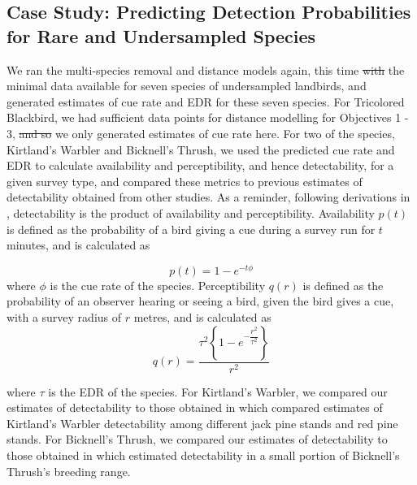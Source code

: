 \documentclass[12pt]{article}
\makeatletter
\providecommand{\DIFadd}[1]{{\protect\color{blue}\uwave{#1}}} %
\providecommand{\DIFdel}[1]{{\protect\color{red}\sout{#1}}} %
\providecommand{\DIFaddbegin}{} %
\providecommand{\DIFaddend}{} %
\providecommand{\DIFdelbegin}{} %
\providecommand{\DIFdelend}{} %
\newcommand{\DIFscaledelfig}{0.5}
\newlength{\DIFdelgraphicswidth} %
\newlength{\DIFdelgraphicsheight} %
\newcommand{\DIFaddincludegraphics}[2][]{{\color{blue}\fbox{\DIFOincludegraphics[#1]{#2}}}} %
\newcommand{\DIFdelincludegraphics}[2][]{%
\sbox{\DIFdelgraphicsbox}{\DIFOincludegraphics[#1]{#2}}%
\settoboxwidth{\DIFdelgraphicswidth}{\DIFdelgraphicsbox} %
\settoboxtotalheight{\DIFdelgraphicsheight}{\DIFdelgraphicsbox} %
\scalebox{\DIFscaledelfig}{%
\parbox[b]{\DIFdelgraphicswidth}{\usebox{\DIFdelgraphicsbox}\\[-\baselineskip] \rule{\DIFdelgraphicswidth}{0em}}\llap{\resizebox{\DIFdelgraphicswidth}{\DIFdelgraphicsheight}{%
\setlength{\unitlength}{\DIFdelgraphicswidth}%
\begin{picture}(1,1)%
\thicklines\linethickness{2pt} %
{\color[rgb]{1,0,0}\put(0,0){\framebox(1,1){}}}%
{\color[rgb]{1,0,0}\put(0,0){\line( 1,1){1}}}%
{\color[rgb]{1,0,0}\put(0,1){\line(1,-1){1}}}%
\end{picture}%
}\hspace*{3pt}}} %
} %
\DeclareRobustCommand{\DIFaddbegin}{\DIFOaddbegin \let\includegraphics\DIFaddincludegraphics} %
\DeclareRobustCommand{\DIFaddend}{\DIFOaddend \let\includegraphics\DIFOincludegraphics} %
\DeclareRobustCommand{\DIFdelbegin}{\DIFOdelbegin \let\includegraphics\DIFdelincludegraphics} %
\DeclareRobustCommand{\DIFdelend}{\DIFOaddend \let\includegraphics\DIFOincludegraphics} %
\let\sout@orig\sout %
\renewcommand{\sout}[1]{\ifmmode\text{\sout@orig{\ensuremath{#1}}}\else\sout@orig{#1}\fi} %
\makeatother
\begin{document}
\subsection{Case Study: Predicting Detection Probabilities for Rare and Undersampled Species}
\par We ran the multi-species removal and distance models again, this time \DIFdelbegin \DIFdel{with }\DIFdelend \DIFaddbegin \DIFadd{including }\DIFaddend the minimal data available for seven species of undersampled landbirds, and generated estimates of cue rate and EDR for these seven species.
For Tricolored Blackbird, \DIFaddbegin \DIFadd{since }\DIFaddend we had sufficient data points for distance modelling for Objectives 1 - 3, \DIFdelbegin \DIFdel{and so }\DIFdelend we only generated estimates of cue rate here.
For two of the species, Kirtland's Warbler and Bicknell's Thrush, we used the predicted cue rate and EDR to calculate availability and perceptibility, and hence detectability, for a given survey type, and compared these metrics to previous estimates of detectability obtained from other studies.
As a reminder, following derivations in \citet{solymos_calibrating_2013}, detectability is the product of availability and perceptibility.
Availability $p(t)$ is defined as the probability of a bird giving a cue during a survey run for $t$ minutes, and is calculated as

\begin{equation}
	p(t) = 1 - e^{-t\phi}
\end{equation}
where $\phi$ is the cue rate of the species.
Perceptibility $q(r)$ is defined as the probability of an observer hearing or seeing a bird, given the bird gives a cue, with a survey radius of $r$ metres, and is calculated as
\begin{equation}
	q(r) = \dfrac{\tau^2 \left\{1 - e^{-\dfrac{r^2}{\tau^2}}\right\}}{r^2}
\end{equation}

where $\tau$ is the EDR of the species.
For Kirtland's Warbler, we compared our estimates of detectability to those obtained in \citet{van_dyke_comparative_2022} which compared estimates of Kirtland's Warbler detectability among different jack pine stands and red pine stands.
For Bicknell's Thrush, we compared our estimates of detectability to those obtained in \citet{aubry_bicknells_2018} which estimated detectability in a small portion of Bicknell's Thrush's breeding range.
\end{document}
